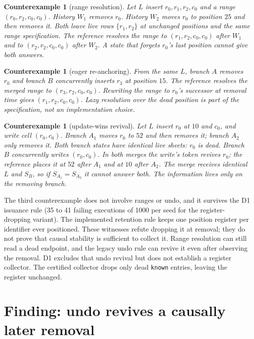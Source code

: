 \documentclass[11pt]{article}
\newtheorem{counterexample}[definition]{Counterexample}
\newcommand{\lean}[1]{\texttt{\def\_{\textunderscore\allowbreak}#1}}
\begin{document}
\begin{counterexample}[range resolution]
Let $L$ insert $r_0,r_1,r_2,c_0$ and a range $(r_0,r_2,c_0,c_0)$. History
$W_1$ removes $r_0$. History $W_2$ moves $r_0$ to position $25$ and then
removes it. Both leave live rows $\{r_1,r_2\}$ at unchanged positions and
the same range specification. The reference resolves the range to
$(r_1,r_2,c_0,c_0)$ after $W_1$ and to $(r_2,r_2,c_0,c_0)$ after $W_2$. A
state that forgets $r_0$'s last position cannot give both answers.
\end{counterexample}

\begin{counterexample}[eager re-anchoring]
From the same $L$, branch $A$ removes $r_0$ and branch $B$ concurrently
inserts $r_3$ at position $15$. The reference resolves the merged range to
$(r_3,r_2,c_0,c_0)$. Rewriting the range to $r_0$'s successor at removal
time gives $(r_1,r_2,c_0,c_0)$. Lazy resolution over the dead position is
part of the specification, not an implementation choice.
\end{counterexample}

\begin{counterexample}[update-wins revival]
Let $L$ insert $r_0$ at $10$ and $c_0$, and write cell $(r_0,c_0)$. Branch
$A_1$ moves $r_0$ to $52$ and then removes it; branch $A_2$ only removes it.
Both branch states have identical live sheets: $r_0$ is dead. Branch $B$
concurrently writes $(r_0,c_0)$. In both merges the write's token revives
$r_0$; the reference places it at $52$ after $A_1$ and at $10$ after $A_2$.
The merge receives identical $L$ and $S_B$, so if $S_{A_1}=S_{A_2}$ it
cannot answer both. The information lives only on the removing branch.
\end{counterexample}

The third counterexample does not involve ranges or undo, and it survives
the D1 issuance rule (35 to 41 failing executions of 1000 per seed for the
register-dropping variant). The
implemented retention rule keeps one position register per identifier ever
positioned. These witnesses refute dropping it at removal; they do not prove
that causal stability is sufficient to collect it. Range resolution can
still read a dead endpoint, and the legacy undo rule can revive it even
after observing the removal. D1 excludes that undo revival but does not
establish a register collector. The certified collector drops only dead
\lean{known} entries, leaving the register unchanged.

\section{Finding: undo revives a causally later removal}
\label{sec:undo}
\end{document}
